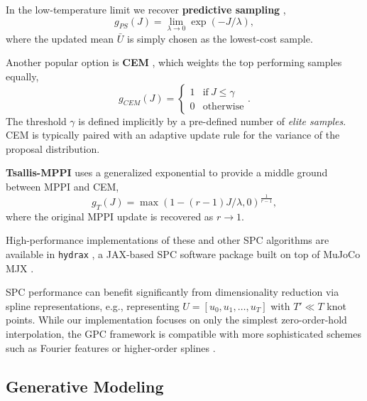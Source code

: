 \documentclass[letterpaper, 10 pt]{ieeeconf}
\begin{document}
In the low-temperature limit we recover \textbf{predictive sampling} \cite{howell2022predictive},
\begin{equation}\label{eq:ps_g}
    g_{PS}(J) = \lim_{\lambda \to 0} \exp\left(- J/\lambda\right),
\end{equation}
where the updated mean $\bar{U}$ is simply chosen as the lowest-cost sample. 

Another popular option is \textbf{CEM} \cite{rubinstein1999cross, li2024drop}, which weights the top performing samples equally,
\begin{equation}\label{eq:cem_g}
    g_{CEM}(J) = \begin{cases}
        1 & \mathrm{if~} J \leq \gamma \\
        0 & \mathrm{otherwise}
    \end{cases}.
\end{equation}
The threshold $\gamma$ is defined implicitly by a pre-defined number of \textit{elite samples}. CEM is typically paired with an adaptive update rule for the variance of the proposal distribution.

\textbf{Tsallis-MPPI} \cite{wang2021variational} uses a generalized exponential to provide a middle ground between MPPI and CEM,
\begin{equation}\label{eq:tsallis_g}
    g_{T}(J) = \max(1 - (r - 1)J/\lambda, 0)^{\frac{1}{r - 1}},
\end{equation}
where the original MPPI update is recovered as $r \to 1$.

High-performance implementations of these and other SPC algorithms are available in \texttt{hydrax} \cite{kurtz2024hydrax}, a JAX-based SPC software package built on top of MuJoCo MJX \cite{mjx}.

\begin{remark}
    SPC performance can benefit significantly from dimensionality reduction via spline representations, e.g., representing $U = [u_0, u_1, \dots, u_T]$ with $T' \ll T$ knot points. While our implementation focuses on only the simplest zero-order-hold interpolation, the GPC framework is compatible with more sophisticated schemes such as Fourier features or higher-order splines \cite{howell2022predictive}.
\end{remark}

\subsection{Generative Modeling}\label{sec:gen}
\end{document}
